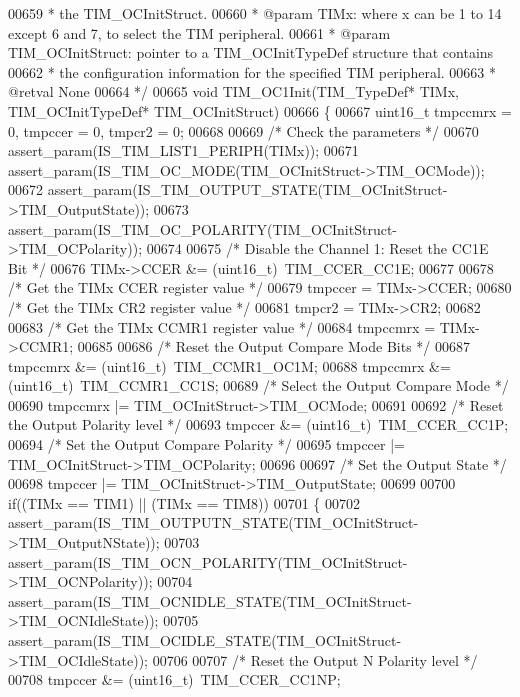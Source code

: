 \begin{DoxyCode}
00659 \textcolor{comment}{  *         the TIM\_OCInitStruct.}
00660 \textcolor{comment}{  * @param  TIMx: where x can be 1 to 14 except 6 and 7, to select the TIM peripheral.}
00661 \textcolor{comment}{  * @param  TIM\_OCInitStruct: pointer to a TIM\_OCInitTypeDef structure that contains}
00662 \textcolor{comment}{  *         the configuration information for the specified TIM peripheral.}
00663 \textcolor{comment}{  * @retval None}
00664 \textcolor{comment}{  */}
00665 \textcolor{keywordtype}{void} TIM_OC1Init(TIM\_TypeDef* TIMx, TIM\_OCInitTypeDef* TIM\_OCInitStruct)
00666 \{
00667   uint16\_t tmpccmrx = 0, tmpccer = 0, tmpcr2 = 0;
00668 
00669   \textcolor{comment}{/* Check the parameters */}
00670   assert_param(IS\_TIM\_LIST1\_PERIPH(TIMx));
00671   assert_param(IS\_TIM\_OC\_MODE(TIM\_OCInitStruct->TIM\_OCMode));
00672   assert_param(IS\_TIM\_OUTPUT\_STATE(TIM\_OCInitStruct->TIM\_OutputState));
00673   assert_param(IS\_TIM\_OC\_POLARITY(TIM\_OCInitStruct->TIM\_OCPolarity));
00674 
00675   \textcolor{comment}{/* Disable the Channel 1: Reset the CC1E Bit */}
00676   TIMx->CCER &= (uint16\_t)~TIM_CCER_CC1E;
00677 
00678   \textcolor{comment}{/* Get the TIMx CCER register value */}
00679   tmpccer = TIMx->CCER;
00680   \textcolor{comment}{/* Get the TIMx CR2 register value */}
00681   tmpcr2 =  TIMx->CR2;
00682 
00683   \textcolor{comment}{/* Get the TIMx CCMR1 register value */}
00684   tmpccmrx = TIMx->CCMR1;
00685 
00686   \textcolor{comment}{/* Reset the Output Compare Mode Bits */}
00687   tmpccmrx &= (uint16\_t)~TIM_CCMR1_OC1M;
00688   tmpccmrx &= (uint16\_t)~TIM_CCMR1_CC1S;
00689   \textcolor{comment}{/* Select the Output Compare Mode */}
00690   tmpccmrx |= TIM\_OCInitStruct->TIM_OCMode;
00691 
00692   \textcolor{comment}{/* Reset the Output Polarity level */}
00693   tmpccer &= (uint16\_t)~TIM_CCER_CC1P;
00694   \textcolor{comment}{/* Set the Output Compare Polarity */}
00695   tmpccer |= TIM\_OCInitStruct->TIM_OCPolarity;
00696 
00697   \textcolor{comment}{/* Set the Output State */}
00698   tmpccer |= TIM\_OCInitStruct->TIM_OutputState;
00699 
00700   \textcolor{keywordflow}{if}((TIMx == TIM1) || (TIMx == TIM8))
00701   \{
00702     assert_param(IS\_TIM\_OUTPUTN\_STATE(TIM\_OCInitStruct->TIM\_OutputNState));
00703     assert_param(IS\_TIM\_OCN\_POLARITY(TIM\_OCInitStruct->TIM\_OCNPolarity));
00704     assert_param(IS\_TIM\_OCNIDLE\_STATE(TIM\_OCInitStruct->TIM\_OCNIdleState));
00705     assert_param(IS\_TIM\_OCIDLE\_STATE(TIM\_OCInitStruct->TIM\_OCIdleState));
00706 
00707     \textcolor{comment}{/* Reset the Output N Polarity level */}
00708     tmpccer &= (uint16\_t)~TIM_CCER_CC1NP;

\end{DoxyCode}
